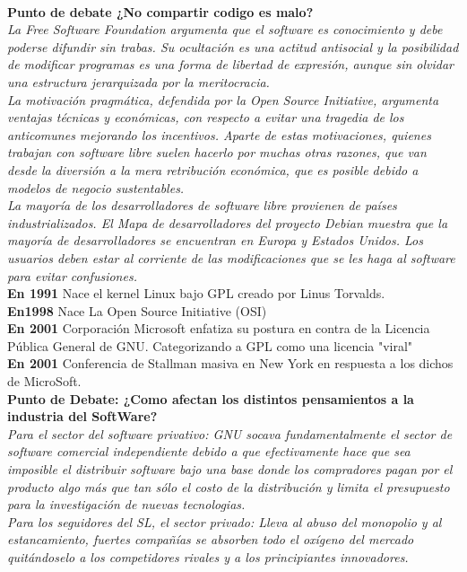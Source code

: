 \documentclass{book}
\begin{document}
\\
{\bf Punto de debate ¿No compartir codigo es malo? }
{\it 
\\
La Free Software Foundation argumenta que el software es conocimiento y debe poderse difundir sin trabas. Su ocultación es una actitud antisocial y la posibilidad de modificar programas es una forma de libertad de expresión, aunque sin olvidar una estructura jerarquizada por la meritocracia.
\\
La motivación pragmática, defendida por la Open Source Initiative, argumenta ventajas técnicas y económicas, con respecto a evitar una tragedia de los anticomunes mejorando los incentivos.
Aparte de estas motivaciones, quienes trabajan con software libre suelen hacerlo por muchas otras razones, que van desde la diversión a la mera retribución económica, que es posible debido a modelos de negocio sustentables.
\\
La mayoría de los desarrolladores de software libre provienen de países industrializados. El Mapa de desarrolladores del proyecto Debian muestra que la mayoría de desarrolladores se encuentran en Europa y Estados Unidos.
Los usuarios deben estar al corriente de las modificaciones que se les haga al software para evitar confusiones.
}
\\
{\bf En 1991} Nace el kernel Linux bajo  GPL creado por Linus Torvalds.
\\
{\bf En1998} Nace La Open Source Initiative (OSI)
\\
{\bf En 2001} Corporación Microsoft enfatiza su postura en contra de la Licencia Pública General de GNU.
Categorizando a GPL como una licencia "viral"
\\
{\bf En 2001} Conferencia de Stallman masiva en New York en respuesta a los dichos de MicroSoft.
\\
{\bf Punto de Debate: ¿Como afectan los distintos pensamientos a la industria del SoftWare? }
{\it 
\\
\emph{Para el sector del software privativo:}
GNU socava fundamentalmente el sector de software comercial independiente debido a que efectivamente hace que sea imposible el distribuir software bajo una base donde los compradores pagan por el producto algo más que tan sólo el costo de la distribución y limita el presupuesto para la investigación de nuevas tecnologias.
\\
\emph{Para los seguidores del SL, el sector privado:}
Lleva al abuso del monopolio y al estancamiento, fuertes compañías se absorben todo el oxígeno del mercado quitándoselo a los competidores rivales y a los principiantes innovadores.
}
\end{document}
